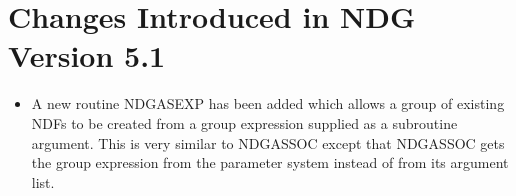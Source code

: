 \documentclass[twoside,11pt]{article}
\renewcommand{\_}{\texttt{\symbol{95}}}
\begin{document}
\section{Changes Introduced in NDG Version 5.1}
\begin{itemize}
   \item A new routine NDG\_ASEXP has been added which allows a group of
         existing NDFs to be created from a group expression supplied as
         a subroutine argument. This is very similar to NDG\_ASSOC except
         that NDG\_ASSOC gets the group expression from the parameter system
         instead of from its argument list.
\end{itemize}
\end{document}
